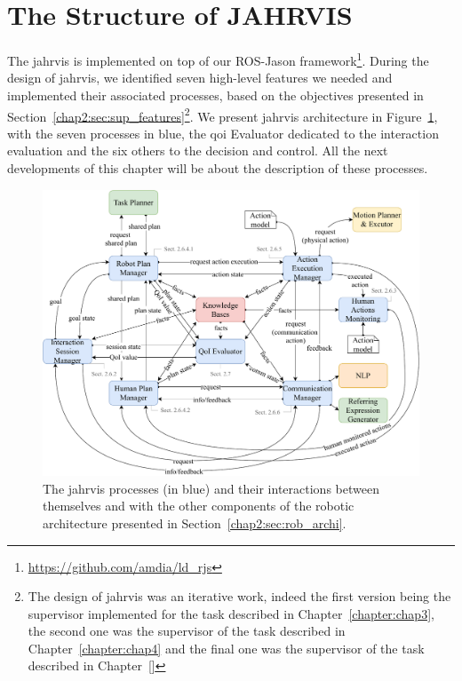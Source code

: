 \documentclass[a4paper,11pt,twoside]{StyleThese}
\begin{document}
\section{The Structure of JAHRVIS}\label{chap2:sec:jahrvis}
The \acrfull{jahrvis} is implemented on top of our ROS-Jason framework\footnote{\url{https://github.com/amdia/ld_rjs}}. During the design of \acrshort{jahrvis}, we identified seven high-level features we needed and implemented their associated processes, based on the objectives presented in Section~\ref{chap2:sec:sup_features}\footnote{The design of \acrshort{jahrvis} was an iterative work, indeed the first version being the supervisor implemented for the task described in Chapter~\ref{chapter:chap3}, the second one was the supervisor of the task described in Chapter~\ref{chapter:chap4} and the final one was the supervisor of the task described in Chapter~\ref{}}. We present \acrshort{jahrvis} architecture in Figure~\ref{chap2:fig:sup_overview}, with the seven processes in blue, the \acrshort{qoi} Evaluator dedicated to the interaction evaluation and the six others to the decision and control. All the next developments of this chapter will be about the description of these processes.

\begin{figure}[!ht]
	\includegraphics[width=\linewidth]{figures/chapter2/supervisor_modules.pdf}
	\caption{The \acrshort{jahrvis} processes (in blue) and their interactions between themselves and with the other components of the robotic architecture presented in Section~\ref{chap2:sec:rob_archi}.}
	\label{chap2:fig:sup_overview}
\end{figure}
\end{document}
